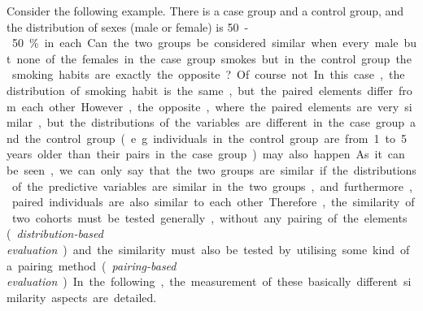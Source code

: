 
Consider the following example. There is a case group and a control group, and the distribution of sexes (male or female) is \SI{50}-\SI{50}{\percent} in each. Can the two groups be considered similar when every male but none of the females in the case group smokes but in the control group the smoking habits are exactly the opposite? Of course not. In this case, the distribution of smoking habit is the same, but the paired elements differ from each other. However, the opposite, where the paired elements are very similar, but the distributions of the variables are different in the case group and the control group (e.g. individuals in the control group are from 1 to 5 years older than their pairs in the case group) may also happen. As it can be seen, we can only say that the two groups are similar if the distributions of the predictive variables are similar in the two groups, and furthermore, paired individuals are also similar to each other.

Therefore, the similarity of two cohorts must be tested generally, without any pairing of the elements (\textit{distribution-based evaluation}) and the similarity must also be tested by utilising some kind of a pairing method (\textit{pairing-based evaluation}). In the following, the measurement of these basically different similarity aspects are detailed.


